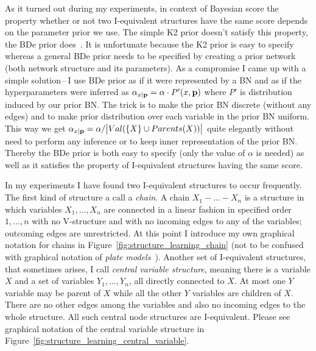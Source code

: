 \documentclass[english,cover]{fitthesis} %
\newcommand{\term}[1]{\emph{#1}}           %
\newcommand{\vars}[1]{{\bold{#1}}}         %
\begin{document}
As it turned out during my experiments, in context of Bayesian score the property whether or not two I-equivalent structures have the same score depends on the parameter prior we use. The simple K2 prior doesn't satisfy this property, the BDe prior does~\cite[p.~807]{pgm}. It is unfortunate because the K2 prior is easy to specify whereas a general BDe prior needs to be specified by creating a prior network (both network structure and its parameters). As a compromise I came up with a simple solution\,--\,I use BDe prior as if it were represented by a BN and as if the hyperparameters were inferred as $\alpha_{x \mid \vars{p}} = \alpha \cdot P'(x, \vars{p})$ where $P'$ is distribution induced by our prior BN. The trick is to make the prior BN discrete (without any edges) and to make prior distribution over each variable in the prior BN uniform. This way we get $\alpha_{x \mid \vars{p}} = \alpha / \bigl | Val(\lbrace X \rbrace \cup Parents(X)) \bigr |$ quite elegantly without need to perform any inference or to keep inner representation of the prior BN. Thereby the BDe prior is both easy to specify (only the value of $\alpha$ is needed) as well as it satisfies the property of I-equivalent structures having the same score.

\medskip
In my experiments I have found two I-equivalent structures to occur frequently. The first kind of structure a call a \term{chain}. A chain $X_1 - \dots - X_n$ is a structure in which variables $X_1, \dots, X_n$ are connected in a linear fashion in specified order $1,\dots,n$ with no V-structure and with no incoming edges to any of the variables; outcoming edges are unrestricted. At this point I introduce my own graphical notation for chains in Figure~\ref{fig:structure_learning_chain} (not to be confused with graphical notation of \term{plate models}~\cite{pgm}). Another set of I-equivalent structures, that sometimes arises, I call \term{central variable structure}, meaning there is a  variable $X$ and a set of variables $Y_1,\dots,Y_n$, all directly connected to $X$. At most one $Y$ variable may be parent of $X$ while all the other $Y$ variables are children of $X$. There are no other edges among the variables and also no incoming edges to the whole structure. All such central node structures are I-equivalent. Please see graphical notation of the central variable structure in Figure~\ref{fig:structure_learning_central_variable}.
\end{document}
